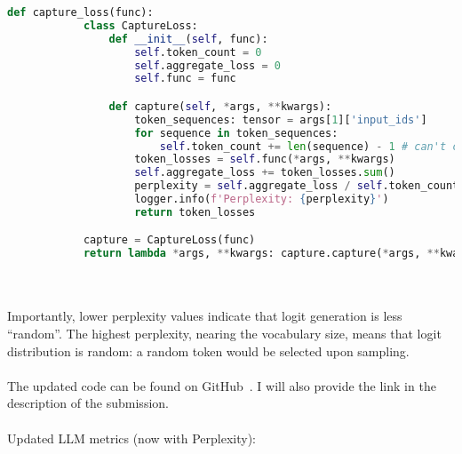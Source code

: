 \documentclass{article}
\begin{document}
    \begin{lstlisting}[language=Python,label={lst:lstlisting2}]
        def capture_loss(func):
            class CaptureLoss:
                def __init__(self, func):
                    self.token_count = 0
                    self.aggregate_loss = 0
                    self.func = func

                def capture(self, *args, **kwargs):
                    token_sequences: tensor = args[1]['input_ids']
                    for sequence in token_sequences:
                        self.token_count += len(sequence) - 1 # can't count first token, is not generated as a part of evaluation
                    token_losses = self.func(*args, **kwargs)
                    self.aggregate_loss += token_losses.sum()
                    perplexity = self.aggregate_loss / self.token_count
                    logger.info(f'Perplexity: {perplexity}')
                    return token_losses

            capture = CaptureLoss(func)
            return lambda *args, **kwargs: capture.capture(*args, **kwargs)
    \end{lstlisting}
    \\ \\
    Importantly, lower perplexity values indicate that logit generation is less ``random''.
    The highest perplexity, nearing the vocabulary size, means that logit distribution is random: a random token would be selected upon sampling.
    \\ \\
    The updated code can be found on GitHub~\cite{llm-test-runner}.
    I will also provide the link in the description of the submission.
    \\ \\
    Updated LLM metrics (now with Perplexity):
\end{document}
